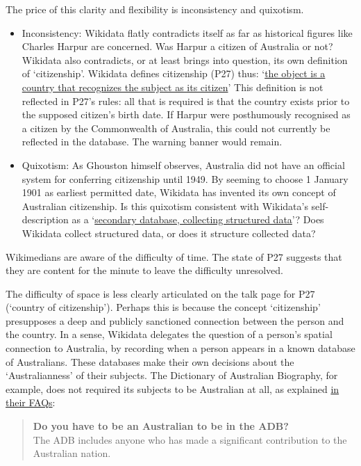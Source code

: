 \documentclass[
  a4paper,
  DIV=11,
  numbers=noendperiod]{scrreprt}
\providecommand{\tightlist}{%
  \setlength{\itemsep}{0pt}\setlength{\parskip}{0pt}}\usepackage{longtable,booktabs,array}
\begin{document}
The price of this clarity and flexibility is inconsistency and
quixotism.

\begin{itemize}
\tightlist
\item
  Inconsistency: Wikidata flatly contradicts itself as far as historical
  figures like Charles Harpur are concerned. Was Harpur a citizen of
  Australia or not? Wikidata also contradicts, or at least brings into
  question, its own definition of `citizenship'. Wikidata defines
  citizenship (P27) thus:
  `\href{https://www.wikidata.org/wiki/Property:P27}{the object is a
  country that recognizes the subject as its citizen}' This definition
  is not reflected in P27's rules: all that is required is that the
  country exists prior to the supposed citizen's birth date. If Harpur
  were posthumously recognised as a citizen by the Commonwealth of
  Australia, this could not currently be reflected in the database. The
  warning banner would remain.
\item
  Quixotism: As Ghouston himself observes, Australia did not have an
  official system for conferring citizenship until 1949. By seeming to
  choose 1 January 1901 as earliest permitted date, Wikidata has
  invented its own concept of Australian citizenship. Is this quixotism
  consistent with Wikidata's self-description as a
  `\href{https://www.wikidata.org/wiki/Wikidata:Introduction}{secondary
  database, collecting structured data}'? Does Wikidata collect
  structured data, or does it structure collected data?
\end{itemize}

Wikimedians are aware of the difficulty of time. The state of P27
suggests that they are content for the minute to leave the difficulty
unresolved.

The difficulty of space is less clearly articulated on the talk page for
P27 (`country of citizenship'). Perhaps this is because the concept
`citizenship' presupposes a deep and publicly sanctioned connection
between the person and the country. In a sense, Wikidata delegates the
question of a person's spatial connection to Australia, by recording
when a person appears in a known database of Australians. These
databases make their own decisions about the `Australianness' of their
subjects. The Dictionary of Australian Biography, for example, does not
required its subjects to be Australian at all, as explained
\href{https://adb.anu.edu.au/faqs/\#aussie}{in their FAQs}:

\begin{quote}
\textbf{Do you have to be an Australian to be in the ADB?}\\
The ADB includes anyone who has made a significant contribution to the
Australian nation.
\end{quote}
\end{document}
